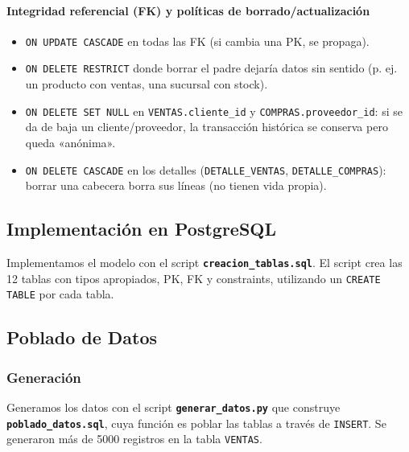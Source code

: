 \documentclass[11pt,a4paper]{article}
\begin{document}
\paragraph{Integridad referencial (FK) y políticas de borrado/actualización}
\begin{itemize}[nosep]
    \item \texttt{ON UPDATE CASCADE} en todas las FK (si cambia una PK, se propaga).
    \item \texttt{ON DELETE RESTRICT} donde borrar el padre dejaría datos sin sentido
    (p. ej. un producto con ventas, una sucursal con stock).
    \item \texttt{ON DELETE SET NULL} en \texttt{VENTAS.cliente\_id} y
    \texttt{COMPRAS.proveedor\_id}: si se da de baja un cliente/proveedor, la transacción
    histórica se conserva pero queda «anónima».
    \item \texttt{ON DELETE CASCADE} en los detalles (\texttt{DETALLE\_VENTAS},
    \texttt{DETALLE\_COMPRAS}): borrar una cabecera borra sus líneas (no tienen vida propia).
\end{itemize}

\subsection{Implementación en PostgreSQL}

Implementamos el modelo con el script \textbf{\texttt{creacion\_tablas.sql}}. El script
crea las 12 tablas con tipos apropiados, PK, FK y constraints, utilizando un
\texttt{CREATE TABLE} por cada tabla.

\subsection{Poblado de Datos}

\subsubsection*{Generación}

Generamos los datos con el script \textbf{\texttt{generar\_datos.py}} que construye
\textbf{\texttt{poblado\_datos.sql}}, cuya función es poblar las tablas a través de
\texttt{INSERT}. Se generaron más de 5000 registros en la tabla \texttt{VENTAS}.
\end{document}
